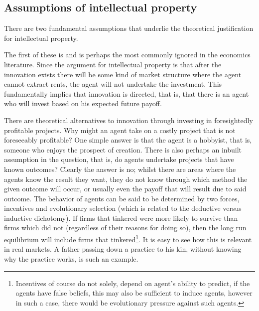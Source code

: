 \subsection{Assumptions of intellectual property}


There are two fundamental assumptions that underlie the theoretical justification for intellectual property. 

The first of these is  and is perhaps the most commonly ignored in the economics literature. Since the argument for intellectual property is that after the innovation exists there will be some kind of market structure where the agent cannot extract rents, the agent will not undertake the investment. This fundamentally implies that innovation is directed, that is, that there is an agent who will invest based on his expected future payoff.

There are theoretical alternatives to innovation through investing in foresightedly profitable projects. Why might an agent take on a costly project that is not foreseeably profitable? One simple answer is that the agent is a hobbyist, that is, someone who enjoys the prospect of creation. There is also perhaps an inbuilt assumption in the question, that is, do agents undertake projects that have known outcomes? Clearly the answer is no; whilst there are areas where the agents know the result they want, they do not know through which method the given outcome will occur, or usually even the payoff that will result due to said outcome. The behavior of agents can be said to be determined by two forces, incentives and evolutionary selection (which is related to the deductive versus inductive dichotomy). If firms that tinkered were more likely to survive than firms which did not (regardless of their reasons for doing so), then the long run equilibrium will include firms that tinkered\footnote{Incentives of course do not solely, depend on agent’s  ability to predict, if the agents have false beliefs, this may also be sufficient to induce agents, however in such a case, there would be evolutionary pressure against such agents.}. It is easy to see how this is relevant in real markets. A father passing down a practice to his kin, without knowing why the practice works, is such an example. 



